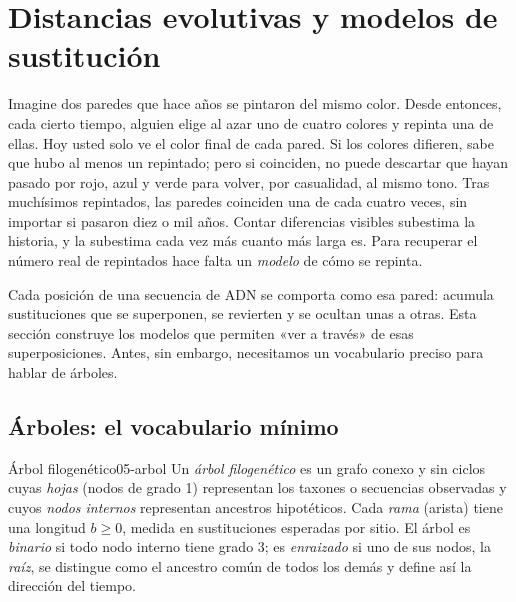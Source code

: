\section{Distancias evolutivas y modelos de sustitución}\label{sec:05-modelos}

\begin{intuicion}
Imagine dos paredes que hace años se pintaron del mismo color. Desde entonces, cada cierto tiempo, alguien elige al azar uno de cuatro colores y repinta una de ellas. Hoy usted solo ve el color final de cada pared. Si los colores difieren, sabe que hubo al menos un repintado; pero si coinciden, no puede descartar que hayan pasado por rojo, azul y verde para volver, por casualidad, al mismo tono. Tras muchísimos repintados, las paredes coinciden una de cada cuatro veces, sin importar si pasaron diez o mil años. Contar diferencias visibles subestima la historia, y la subestima cada vez más cuanto más larga es. Para recuperar el número real de repintados hace falta un \emph{modelo} de cómo se repinta.
\end{intuicion}

Cada posición de una secuencia de ADN se comporta como esa pared: acumula sustituciones que se superponen, se revierten y se ocultan unas a otras. Esta sección construye los modelos que permiten «ver a través» de esas superposiciones. Antes, sin embargo, necesitamos un vocabulario preciso para hablar de árboles.

\subsection{Árboles: el vocabulario mínimo}

\begin{definicion}{Árbol filogenético}{05-arbol}
Un \emph{árbol filogenético} es un grafo conexo y sin ciclos cuyas \emph{hojas} (nodos de grado 1) representan los taxones o secuencias observadas y cuyos \emph{nodos internos} representan ancestros hipotéticos. Cada \emph{rama} (arista) tiene una longitud $b\ge 0$, medida en sustituciones esperadas por sitio. El árbol es \emph{binario} si todo nodo interno tiene grado 3; es \emph{enraizado} si uno de sus nodos, la \emph{raíz}, se distingue como el ancestro común de todos los demás y define así la dirección del tiempo.
\end{definicion}

